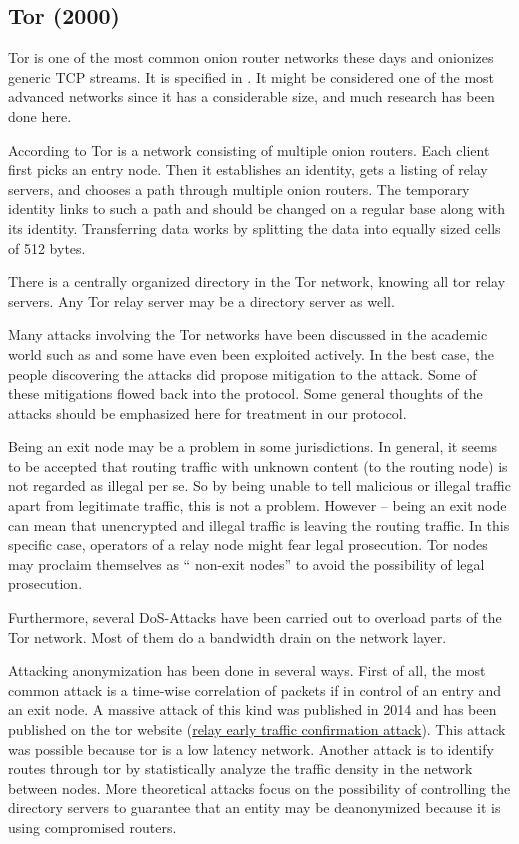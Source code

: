 \subsection{Tor (2000)\label{sec:tor}}
Tor is one of the most common onion router networks these days and onionizes generic TCP streams. It is specified in \cite{tor-spec}. It might be considered one of the most advanced networks since it has a considerable size, and much research has been done here.

According to \cite{onion-routing:pet2000} Tor is a network consisting of multiple onion routers. Each client first picks an entry node. Then it establishes an identity, gets a listing of relay servers, and chooses a path through multiple onion routers. The temporary identity links to such a path and should be changed on a regular base along with its identity. Transferring data works by splitting the data into equally sized cells of 512 bytes.

There is a centrally organized directory in the Tor network, knowing all tor relay servers. Any Tor relay server may be a directory server as well. 

Many attacks involving the Tor networks have been discussed in the academic world such as \cite{hs-attack06,esorics13-cellflood,bauer:wpes2007,esorics12-torscan,oakland2013-trawling,danner-et-al:tissec12,congestion-longpaths} and some have even been exploited actively. In the best case, the people discovering the attacks did propose mitigation to the attack. Some of these mitigations flowed back into the protocol. Some general thoughts of the attacks should be emphasized here for treatment in our protocol.

Being an exit node may be a problem in some jurisdictions. In general, it seems to be accepted that routing traffic with unknown content (to the routing node) is not regarded as illegal per se. So by being unable to tell malicious or illegal traffic apart from legitimate traffic, this is not a problem. However -- being an exit node can mean that unencrypted and illegal traffic is leaving the routing traffic. In this specific case, operators of a relay node might fear legal prosecution. Tor nodes may proclaim themselves as  `` non-exit nodes''  to avoid the possibility of legal prosecution.

Furthermore, several DoS-Attacks have been carried out to overload parts of the Tor network. Most of them do a bandwidth drain on the network layer.

Attacking anonymization has been done in several ways. First of all, the most common attack is a time-wise correlation of packets if in control of an entry and an exit node. A massive attack of this kind was published in 2014 and has been published on the tor website (\href{https://blog.torproject.org/blog/tor-security-advisory-relay-early-traffic-confirmation-attack}{relay early traffic confirmation attack}). This attack was possible because tor is a low latency network. Another attack is to identify routes through tor by statistically analyze the traffic density in the network between nodes. More theoretical attacks focus on the possibility of controlling the directory servers to guarantee that an entity may be deanonymized because it is using compromised routers.

